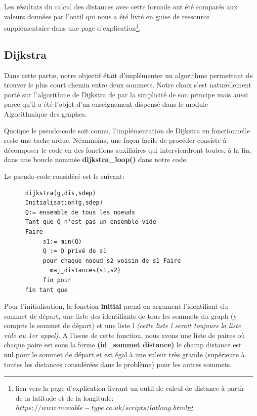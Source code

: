 \documentclass[french]{article}
\begin{document}
Les résultats du calcul des distances avec cette formule ont été comparés aux valeurs données par l'outil qui nous a été livré en guise de ressource supplémentaire dans une page d'explication\footnote{lien vers la page d'explication livrant un outil de calcul de distance à partir de la latitude et de la longitude: $https://www.movable-type.co.uk/scripts/latlong.html$}. 

\subsection{Dijkstra}%

Dans cette partie, notre objectif était d'implémenter un algorithme permettant de trouver le plus court chemin entre deux sommets. Notre choix s'est naturellement porté sur l'algorithme de Dijkstra de par la simplicité de son principe mais aussi parce qu'il a été l'objet d'un enseignement dispensé dans le module Algorithmique des graphes.\newline 

Quoique le pseudo-code soit connu, l'implémentation de Dijkstra en fonctionnelle reste une tache ardue. Néanmoins, une façon facile de procéder consiste à décomposer le code en des fonctions auxiliaires qui interviendront toutes, à la fin, dans une boucle nommée \textbf{dijkstra\_loop()} dans notre code.\newline  

Le pseudo-code considéré est le suivant: \\
\begin{lstlisting}
      dijkstra(g,dis,sdep)                                  
      Initialisation(g,sdep)                                
      Q:= ensemble de tous les noeuds
      Tant que Q n'est pas un ensemble vide
      Faire
           s1:= min(Q)
           Q := Q privé de s1
           pour chaque noeud s2 voisin de s1 Faire
             maj_distances(s1,s2)
           fin pour
      fin tant que
\end{lstlisting}

Pour l'initialisation, la fonction \textbf{initial} prend en argument l'identifiant du sommet de départ, une liste des identifiants de tous les sommets du graph (y compris le sommet de départ) et une liste l \textit{(cette liste l serait toujours la liste vide au 1er appel)}. 
\newline
A l'issue de cette fonction, nous avons une liste de paires où chaque paire est sous la forme \textbf{(id\_sommet distance)} le champ distance est nul pour le sommet de départ et est égal à une valeur très grande (supérieure à toutes les distances considérées dans le problème) pour les autres sommets.\newline
\end{document}
